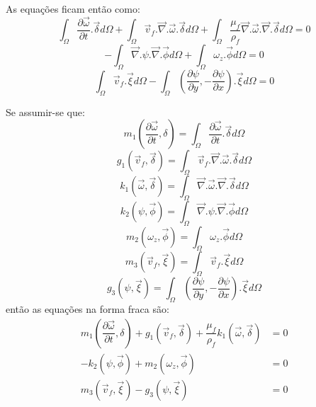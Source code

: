 As equações ficam então como:
\begin{equation}
    \int_{\Omega}
    \dfrac{\partial \vec{\omega}}{\partial t}
    .\vec{\delta} d\Omega +
    \int_{\Omega}
    \vec{v}_f.\vec{\nabla}.\vec{\omega}
    .\vec{\delta} d\Omega +
    \int_{\Omega}
    \dfrac{\mu_f}{\rho_f}
    \vec{\nabla}.\vec{\omega}.\vec{\nabla}
    .\vec{\delta} d\Omega= 0
\end{equation}
\begin{equation}
    -\int_{\Omega}
    \vec{\nabla}.\psi.\vec{\nabla}
    .\vec{\phi} d\Omega +
    \int_{\Omega}
    \omega_z
    .\vec{\phi} d\Omega = 0
\end{equation}
\begin{equation}
    \int_{\Omega}
    \vec{v}_f
    .\vec{\xi} d\Omega -
    \int_{\Omega}
    \left(\dfrac{\partial \psi}{\partial y},
    -\dfrac{\partial \psi}{\partial x} \right)
    .\vec{\xi} d\Omega = 0
\end{equation}

Se assumir-se que:
\begin{equation}
    m_1 \left(\dfrac{\partial \vec{\omega}}{\partial t}, \delta\right) =
    \int_{\Omega}
    \dfrac{\partial \vec{\omega}}{\partial t}
    .\vec{\delta} d\Omega
\end{equation}
\begin{equation}
    g_1 (\vec{v}_f, \vec{\delta}) =
    \int_{\Omega}
    \vec{v}_f.\vec{\nabla}.\vec{\omega}
    .\vec{\delta} d\Omega
\end{equation}
\begin{equation}
    k_1 (\vec{\omega}, \vec{\delta}) =
    \int_{\Omega}
    \vec{\nabla}.\vec{\omega}.\vec{\nabla}
    .\vec{\delta} d\Omega
\end{equation}
\begin{equation}
    k_2 (\psi, \vec{\phi}) =
    \int_{\Omega}
    \vec{\nabla}.\psi.\vec{\nabla}
    .\vec{\phi} d\Omega
\end{equation}
\begin{equation}
    m_2 (\omega_z, \vec{\phi}) =
    \int_{\Omega}
    \omega_z
    .\vec{\phi} d\Omega
\end{equation}
\begin{equation}
    m_3 (\vec{v}_f, \vec{\xi}) =
    \int_{\Omega}
    \vec{v}_f
    .\vec{\xi} d\Omega
\end{equation}
\begin{equation}
    g_3 (\psi, \vec{\xi}) =
    \int_{\Omega}
    \left(\dfrac{\partial \psi}{\partial y},
    -\dfrac{\partial \psi}{\partial x} \right)
    .\vec{\xi} d\Omega
\end{equation}
então as equações na forma fraca são:
\begin{align}
    m_1 \left(\dfrac{\partial \vec{\omega}}{\partial t}, \delta\right) +
    g_1 (\vec{v}_f, \vec{\delta}) + 
    \dfrac{\mu_f}{\rho_f} k_1 (\vec{\omega}, \vec{\delta}) &=0\\
    -k_2 (\psi, \vec{\phi}) +
    m_2 (\omega_z, \vec{\phi}) &= 0 \\
    m_3 (\vec{v}_f, \vec{\xi}) - 
    g_3 (\psi, \vec{\xi}) &=0
\end{align}

